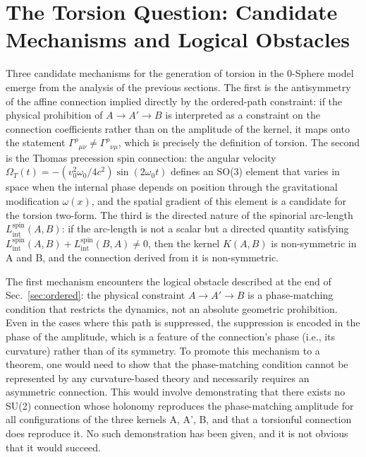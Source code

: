 \documentclass[%
 reprint,
 amsmath,amssymb,
 aps,
 prb,
]{revtex4-2}
\numberwithin{equation}{section}
\newcommand{\Lspin}{L_{\text{int}}^{\text{spin}}}
\newcommand{\KAB}{K(A,B)}
\newcommand{\OmT}{\Omega_{T}}
\begin{document}
\section{The Torsion Question: Candidate Mechanisms and Logical Obstacles}
\label{sec:torsion}

Three candidate mechanisms for the generation of torsion in the 0-Sphere model emerge from the analysis of the previous sections. The first is the antisymmetry of the affine connection implied directly by the ordered-path constraint: if the physical prohibition of $A\to A'\to B$ is interpreted as a constraint on the connection coefficients rather than on the amplitude of the kernel, it maps onto the statement $\Gamma^\rho{}_{\mu\nu} \neq \Gamma^\rho{}_{\nu\mu}$, which is precisely the definition of torsion. The second is the Thomas precession spin connection: the angular velocity $\OmT(t) = -(v_0^2\omega_0/4c^2)\sin(2\omega_0 t)$ defines an SO(3) element that varies in space when the internal phase depends on position through the gravitational modification $\omega(x)$, and the spatial gradient of this element is a candidate for the torsion two-form. The third is the directed nature of the spinorial arc-length $\Lspin(A,B)$: if the arc-length is not a scalar but a directed quantity satisfying $\Lspin(A,B) + \Lspin(B,A) \neq 0$, then the kernel $\KAB$ is non-symmetric in A and B, and the connection derived from it is non-symmetric.

The first mechanism encounters the logical obstacle described at the end of Sec.~\ref{sec:ordered}: the physical constraint $A\to A'\to B$ is a phase-matching condition that restricts the dynamics, not an absolute geometric prohibition. Even in the cases where this path is suppressed, the suppression is encoded in the phase of the amplitude, which is a feature of the connection's phase (i.e., its curvature) rather than of its symmetry. To promote this mechanism to a theorem, one would need to show that the phase-matching condition cannot be represented by any curvature-based theory and necessarily requires an asymmetric connection. This would involve demonstrating that there exists no SU(2) connection whose holonomy reproduces the phase-matching amplitude for all configurations of the three kernels A, A', B, and that a torsionful connection does reproduce it. No such demonstration has been given, and it is not obvious that it would succeed.
\end{document}
